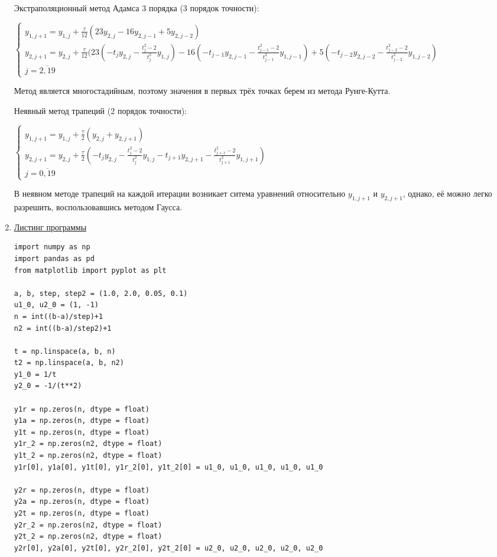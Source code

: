 \documentclass{article}%
\begin{document}
\begin{enumerate}
\vskip 0.2in

Экстраполяционный метод Адамса 3 порядка (3 порядок точности):

$\begin{cases} 
y_{1,j+1} =  y_{1,j} + \frac{\tau}{12} (23y_{2,j} - 16y_{2,j-1} + 5y_{2,j-2}) \\ y_{2,j+1} =  y_{2,j} + \frac{\tau}{12} (23(-t_j y_{2,j} -  \frac{t_j^2-2}{t_j^2}   y_{1,j}) - 16(-t_{j-1} y_{2,j-1} -  \frac{t_{j-1}^2-2}{t_{j-1}^2}   y_{1,j-1}) + 5(-t_{j-2} y_{2,j-2} -  \frac{t_{j-2}^2-2}{t_{j-2}^2}   y_{1,j-2}) \\ j = \overline{2,19}
\end{cases}$

Метод является многостадийным, поэтому значения в первых трёх точках берем из метода Рунге-Кутта.

\vskip 0.2in

Неявный метод трапеций (2 порядок точности):

$\begin{cases} 
y_{1,j+1} =  y_{1,j} + \frac{\tau}{2} (y_{2,j} + y_{2,j+1}) \\ y_{2,j+1} =  y_{2,j} + \frac{\tau}{2} (-t_j y_{2,j} -  \frac{t_j^2-2}{t_j^2}   y_{1,j} - t_{j+1} y_{2,j+1} -  \frac{t_{j+1}^2-2}{t_{j+1}^2}   y_{1,j+1}) \\ j = \overline{0,19}
\end{cases}$

В неявном методе трапеций на каждой итерации возникает ситема уравнений относительно $y_{1,j+1}$ и $y_{2,j+1}$, однако, её можно легко разрешить, воспользовавшись методом Гаусса.

\item%
\underline{Листинг программы}

\begin{verbatim}
import numpy as np
import pandas as pd
from matplotlib import pyplot as plt

a, b, step, step2 = (1.0, 2.0, 0.05, 0.1)
u1_0, u2_0 = (1, -1)
n = int((b-a)/step)+1
n2 = int((b-a)/step2)+1

t = np.linspace(a, b, n)
t2 = np.linspace(a, b, n2)
y1_0 = 1/t
y2_0 = -1/(t**2)

y1r = np.zeros(n, dtype = float)
y1a = np.zeros(n, dtype = float)
y1t = np.zeros(n, dtype = float)
y1r_2 = np.zeros(n2, dtype = float)
y1t_2 = np.zeros(n2, dtype = float)
y1r[0], y1a[0], y1t[0], y1r_2[0], y1t_2[0] = u1_0, u1_0, u1_0, u1_0, u1_0

y2r = np.zeros(n, dtype = float)
y2a = np.zeros(n, dtype = float)
y2t = np.zeros(n, dtype = float)
y2r_2 = np.zeros(n2, dtype = float)
y2t_2 = np.zeros(n2, dtype = float)
y2r[0], y2a[0], y2t[0], y2r_2[0], y2t_2[0] = u2_0, u2_0, u2_0, u2_0, u2_0



\end{verbatim}
\end{enumerate}
\end{document}
